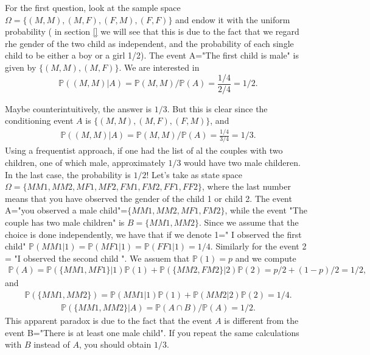 \documentclass[12pt]{article}
\newcommand{\<}{{\langle \!\! \langle}}
\renewcommand{\>}{{\rangle \!\! \rangle}}
\newcommand{\bel}[2]{\begin{equation} \label{#1} \begin{split} #2
 					\end{split} \end{equation}}
\begin{document}
For the first question, look at the sample space $\Omega=\{(M,M),(M,F),(F,M),(F,F)\}$ and endow it with the uniform probability ( in section \ref{} we will see that this is due to the fact that we regard rhe gender of the two child as independent, and the probability of each single child to be either a boy or a girl 1/2). The event A="The first child is male" is given by $\{(M,M),(M,F)\}.$ We are interested in $$\mathbb{P}((M,M)|A)=\mathbb{P}(M,M)/\mathbb{P}(A)=\frac{1/4}{2/4}=1/2.$$

Maybe counterintuitively, the answer is  $1/3$. But this is clear since the conditioning event $A$ is $\{(M,M),(M,F),(F,M)\}$, and 
\bel{}{\mathbb{P}((M,M)|A)=\mathbb{P}(M,M)/\mathbb{P}(A)=\frac{1/4}{3/4}=1/3.}
Using a frequentist approach, if one had the list of al the couples with two children, one of which male, approximately $1/3$ would have two male childeren.\\  
In the last case, the probability is $1/2$! Let's take as state space $\Omega=\{MM1,MM2,MF1,MF2,FM1,FM2,FF1,FF2\}$, where the last number means that you have observed the gender of the child 1 or child 2. The event A="you observed a male child"=$\{MM1,MM2,MF1,FM2\}$, while the event "The couple has two male children" is $B=\{MM1,MM2\}$. Since we assume that the choice is done independently, we have that if we denote 1=" I observed the first child"  $\mathbb{P}(MM1|1)=\mathbb{P}(MF1|1)=\mathbb{P}(FF1|1)=1/4$. Similarly for the event 2 = "I observed the second child ". We assuem that $\mathbb{P}(1)=p$ and we compute 
\bel{}{ \mathbb{P}(A) = \mathbb{P}(\{MM1,MF1\}|1)\mathbb{P}(1)+ \mathbb{P}(\{MM2,FM2\}|2)\mathbb{P}(2) = p/2+(1-p)/2=1/2, }
and 
\bel{}{\mathbb{P}(\{ MM1,MM2\}) =\mathbb{P}(MM1|1)\mathbb{P}(1)+\mathbb{P}(MM2|2)\mathbb{P}(2) = 1/4. }
\bel{}{
	\mathbb{P}(\{MM1,MM2\}|A)=\mathbb{P}(A \cap B) / \mathbb{P}(A) = 1/2.}
This apparent paradox is due to the fact that the event $A$ is different from the event B="There is at least one male child". If you repeat the same calculations with $B$ instead of $A$, you should obtain $1/3$. 
\end{document}
